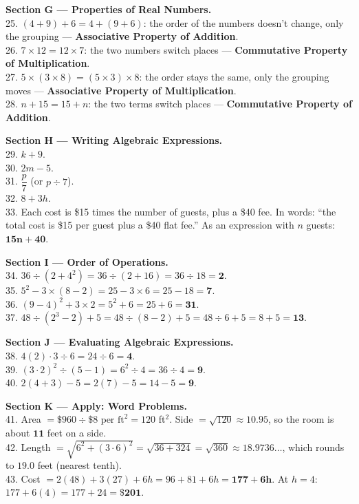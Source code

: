 \documentclass[11pt]{article}
\begin{document}
\textbf{Section G --- Properties of Real Numbers.}\\
25. $(4+9)+6=4+(9+6)$: the order of the numbers doesn't change, only the grouping --- \textbf{Associative Property of Addition}.\\
26. $7\times12=12\times7$: the two numbers switch places --- \textbf{Commutative Property of Multiplication}.\\
27. $5\times(3\times8)=(5\times3)\times8$: the order stays the same, only the grouping moves --- \textbf{Associative Property of Multiplication}.\\
28. $n+15=15+n$: the two terms switch places --- \textbf{Commutative Property of Addition}.

\textbf{Section H --- Writing Algebraic Expressions.}\\
29. $k+9$.\\
30. $2m-5$.\\
31. $\dfrac{p}{7}$ (or $p\div7$).\\
32. $8+3h$.\\
33. Each cost is \$15 times the number of guests, plus a \$40 fee. In words:
``the total cost is \$15 per guest plus a \$40 flat fee.'' As an expression with
$n$ guests: $\mathbf{15n+40}$.

\textbf{Section I --- Order of Operations.}\\
34. $36\div(2+4^2)=36\div(2+16)=36\div18=\mathbf{2}$.\\
35. $5^2-3\times(8-2)=25-3\times6=25-18=\mathbf{7}$.\\
36. $(9-4)^2+3\times2=5^2+6=25+6=\mathbf{31}$.\\
37. $48\div(2^3-2)+5=48\div(8-2)+5=48\div6+5=8+5=\mathbf{13}$.

\textbf{Section J --- Evaluating Algebraic Expressions.}\\
38. $4(2)\cdot3\div6 = 24\div6 = \mathbf{4}$.\\
39. $(3\cdot2)^2\div(5-1) = 6^2\div4 = 36\div4 = \mathbf{9}$.\\
40. $2(4+3)-5 = 2(7)-5 = 14-5 = \mathbf{9}$.

\textbf{Section K --- Apply: Word Problems.}\\
41. Area $=\$960\div\$8\text{ per ft}^2 = 120$ ft$^2$. Side $=\sqrt{120}\approx10.95$, so the room is about $\mathbf{11}$ feet on a side.\\
42. Length $=\sqrt{6^2+(3\cdot6)^2}=\sqrt{36+324}=\sqrt{360}\approx18.9736\dots$, which rounds to $\mathbf{19.0}$ feet (nearest tenth).\\
43. Cost $=2(48)+3(27)+6h = 96+81+6h = \mathbf{177+6h}$. At $h=4$: $177+6(4)=177+24=\mathbf{\$201}$.
\end{document}
